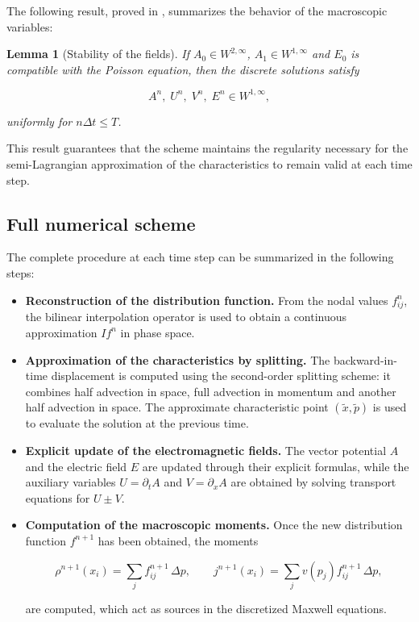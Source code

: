 \documentclass[11pt,a4paper,twoside,pdf]{article}
\numberwithin{equation}{section}
\newtheorem{lemma}[theorem]{Lemma}
\begin{document}
The following result, proved in \cite{bostan2009convergence}, summarizes the behavior of the macroscopic variables:

\begin{lemma}[Stability of the fields]
If $A_0\in W^{2,\infty}$, $A_1\in W^{1,\infty}$ and $E_0$ is compatible with the Poisson
equation, then the discrete solutions satisfy


\[
A^n,\; U^n,\; V^n,\; E^n \in W^{1,\infty},
\]


uniformly for $n\Delta t\le T$.
\end{lemma}

This result guarantees that the scheme maintains the regularity necessary for
the semi-Lagrangian approximation of the characteristics to remain valid at each
time step.

\medskip




\subsection{Full numerical scheme}

The complete procedure at each time step can be summarized in the following steps:

\begin{itemize}
\item \textbf{Reconstruction of the distribution function.}
From the nodal values $f^n_{ij}$, the bilinear interpolation operator
is used to obtain a continuous approximation $I f^n$ in phase space.


\item \textbf{Approximation of the characteristics by splitting.}
The backward-in-time displacement is computed using the second-order splitting
scheme: it combines half advection in space, full advection
in momentum and another half advection in space.
The approximate characteristic point $(\tilde{x},\tilde{p})$ is used to evaluate the solution at the previous time.

\item \textbf{Explicit update of the electromagnetic fields.}
The vector potential $A$ and the electric field $E$ are updated through their
explicit formulas, while the auxiliary variables $U=\partial_t A$ and
$V=\partial_x A$ are obtained by solving transport equations for
$U\pm V$.


\item \textbf{Computation of the macroscopic moments.}
Once the new distribution function $f^{n+1}$ has been obtained, the moments


\[
\rho^{n+1}(x_i)=\sum_j f^{n+1}_{ij}\,\Delta p, \qquad
j^{n+1}(x_i)=\sum_j v(p_j)f^{n+1}_{ij}\,\Delta p,
\]


are computed, which act as sources in the discretized Maxwell equations.
\end{itemize}
\end{document}

